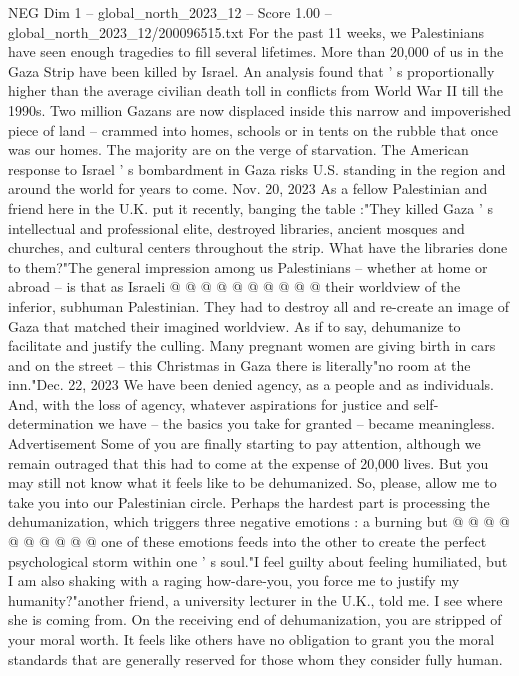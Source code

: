 \begin{textsample}{NEG Dim 1 – global\_north\_2023\_12 – Score 1.00 – global\_north\_2023\_12/200096515.txt}  \label{ex:f1_neg_199}
For the past 11 weeks, we Palestinians have seen enough tragedies to fill several lifetimes.
More than 20,000 of us in the Gaza Strip have been killed by Israel.
An analysis found that ' s proportionally higher than the average civilian death toll in conflicts from World War II till the 1990s.
Two million Gazans are now displaced inside this narrow and impoverished piece of land -- crammed into homes, schools or in tents on the rubble that once was our homes.
The majority are on the verge of starvation.
The American response to Israel ' s bombardment in Gaza risks U.S. standing in the region and around the world for years to come.
Nov. 20, 2023 As a fellow Palestinian and friend here in the U.K. put it recently, banging the table :"They killed Gaza ' s intellectual and professional elite, destroyed libraries, ancient mosques and churches, and cultural centers throughout the strip.
What have the libraries done to them?"The general impression among us Palestinians -- whether at home or abroad -- is that as Israeli @ @ @ @ @ @ @ @ @ @ their worldview of the inferior, subhuman Palestinian.
They had to destroy all and re-create an image of Gaza that matched their imagined worldview.
As if to say, dehumanize to facilitate and justify the culling.
Many pregnant women are giving birth in cars and on the street -- this Christmas in Gaza there is literally"no room at the inn."Dec. 22, 2023 We have been denied agency, as a people and as individuals.
And, with the loss of agency, whatever aspirations for justice and self-determination we have -- the basics you take for granted -- became meaningless.
Advertisement Some of you are finally starting to pay attention, although we remain outraged that this had to come at the expense of 20,000 lives.
But you may still not know what it feels like to be dehumanized.
So, please, allow me to take you into our Palestinian circle.
Perhaps the hardest part is processing the dehumanization, which triggers three negative emotions : a burning but @ @ @ @ @ @ @ @ @ @ one of these emotions feeds into the other to create the perfect psychological storm within one ' s soul."I feel guilty about feeling humiliated, but I am also shaking with a raging how-dare-you, you force me to justify my humanity?"another friend, a university lecturer in the U.K., told me.
I see where she is coming from.
On the receiving end of dehumanization, you are stripped of your moral worth.
It feels like others have no obligation to grant you the moral standards that are generally reserved for those whom they consider fully human.

\end{textsample}
